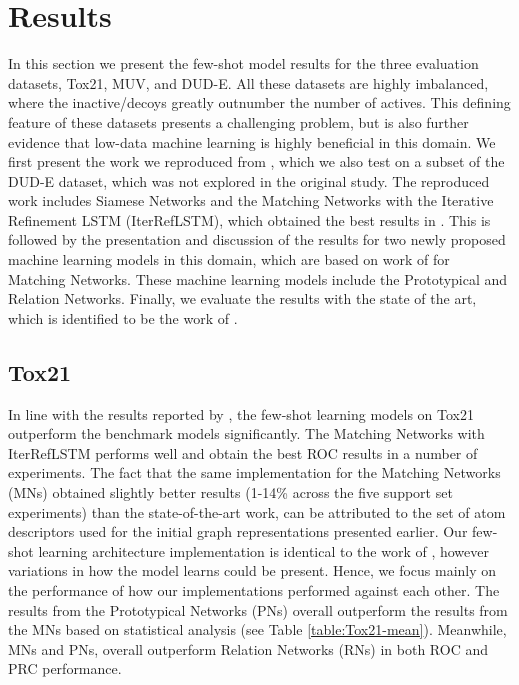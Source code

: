 \section{Results}

In this section we present the few-shot model results for the three evaluation datasets, Tox21, MUV, and DUD-E. All these datasets are highly imbalanced, where the inactive/decoys greatly outnumber the number of actives. This defining feature of these datasets presents a challenging problem, but is also further evidence that low-data machine learning is highly beneficial in this domain. We first present the work we reproduced from \citet{altae2017low}, which we also test on a subset of the DUD-E dataset, which was not explored in the original study. The reproduced work includes Siamese Networks \citep{koch2015siamese} and the Matching Networks \citep{vinyals2016matching} with the Iterative Refinement LSTM (IterRefLSTM), which obtained the best results in \citet{altae2017low}. This is followed by the presentation and discussion of the results for two newly proposed machine learning models in this domain, which are based on work of \citet{vinyals2016matching} for Matching Networks. These machine learning models include the Prototypical \citep{snell2017prototypical} and Relation \citep{sung2018learning} Networks. Finally, we evaluate the results with the state of the art, which is identified to be the work of \citet{altae2017low}.

\subsection{Tox21}

In line with the results reported by \citet{altae2017low}, the few-shot learning models on Tox21 outperform the benchmark models significantly. The Matching Networks with IterRefLSTM performs well and obtain the best ROC results in a number of experiments. The fact that the same implementation for the Matching Networks (MNs) obtained slightly better results (1-14\% across the five support set experiments) than the state-of-the-art work, can be attributed to the set of atom descriptors used for the initial graph representations presented earlier. Our few-shot learning architecture implementation is identical to the work of \citet{altae2017low}, however variations in how the model learns could be present. Hence, we focus mainly on the performance of how our implementations performed against each other. The results from the Prototypical Networks (PNs) overall outperform the results from the MNs based on statistical analysis (see Table \ref{table:Tox21-mean}). Meanwhile, MNs and PNs, overall outperform Relation Networks (RNs) in both ROC and PRC performance. 

